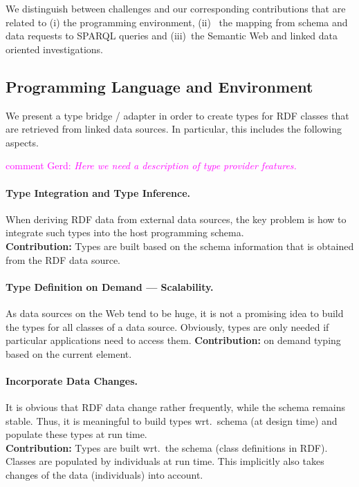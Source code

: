 \documentclass{llncs} %
\newcommand{\ggr}[1]{\textcolor{magenta}{comment Gerd: \textit{#1}}}
\begin{document}
We distinguish between challenges and our corresponding contributions 
that are related to (i) the programming environment, (ii)~ the mapping from
schema and data requests to SPARQL queries and (iii)~the Semantic Web and linked data
oriented investigations.

\subsection*{Programming Language and Environment}

We present a type bridge / adapter in order to create types for RDF classes that
are retrieved from linked data sources. In particular, this includes the following aspects.

\ggr{Here we need a description of type provider features.}

\paragraph*{\bf Type Integration and Type Inference.}
When deriving RDF data from external data sources, the key problem is how to integrate
such types into the host programming schema. \\
\textbf{Contribution:} Types are built based on the schema information that is obtained
from the RDF data source.   \\

\paragraph{\bf Type Definition on Demand --- Scalability.}
As data sources on the Web tend to be huge, it is not a promising idea to
build the types for all classes of a data source.
Obviously, types are only needed if particular applications need to access them.
\textbf{Contribution:} on demand typing based on the current element. \\


\paragraph*{\bf Incorporate Data Changes.}
It is obvious that RDF data change rather frequently, while the
schema remains stable. Thus, it is meaningful to build types wrt.\ schema (at design time)
and populate these types at run time.\\
\textbf{Contribution:} Types are built wrt.\ the schema (class definitions in RDF).
Classes are populated by individuals at run time.
This implicitly also takes changes of the data (individuals) into account. \\
\end{document}
